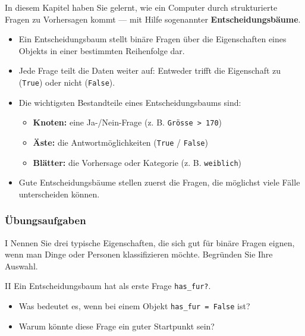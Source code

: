 In diesem Kapitel haben Sie gelernt, wie ein Computer durch strukturierte Fragen zu Vorhersagen kommt — mit Hilfe sogenannter \textbf{Entscheidungsbäume}.  

\begin{itemize}
  \item Ein Entscheidungsbaum stellt binäre Fragen über die Eigenschaften eines Objekts in einer bestimmten Reihenfolge dar.
  \item Jede Frage teilt die Daten weiter auf: Entweder trifft die Eigenschaft zu (\texttt{True}) oder nicht (\texttt{False}).
  \item Die wichtigsten Bestandteile eines Entscheidungsbaums sind:
  \begin{itemize}
    \item \textbf{Knoten:} eine Ja-/Nein-Frage (z. B. \texttt{Grösse > 170})
    \item \textbf{Äste:} die Antwortmöglichkeiten (\texttt{True} / \texttt{False})
    \item \textbf{Blätter:} die Vorhersage oder Kategorie (z. B. \texttt{weiblich})
  \end{itemize}
  \item Gute Entscheidungsbäume stellen zuerst die Fragen, die möglichst viele Fälle unterscheiden können.  
\end{itemize}

\subsubsection*{Übungsaufgaben}

\begin{aufgabe}{I}
Nennen Sie drei typische Eigenschaften, die sich gut für binäre Fragen eignen, wenn man Dinge oder Personen klassifizieren möchte. Begründen Sie Ihre Auswahl.
\end{aufgabe}

\begin{aufgabe}{II}
Ein Entscheidungsbaum hat als erste Frage \texttt{has\_fur?}.  
\begin{itemize}
  \item Was bedeutet es, wenn bei einem Objekt \texttt{has\_fur = False} ist?  
  \item Warum könnte diese Frage ein guter Startpunkt sein?
\end{itemize}
\end{aufgabe}

